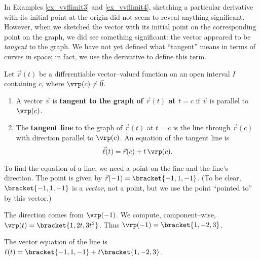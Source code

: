 In Examples \ref{ex_vvflimit3} and \ref{ex_vvflimit4}, sketching a particular derivative with its initial point at the origin did not seem to reveal anything significant. However, when we sketched the vector with its initial point on the corresponding point on the graph, we did see something significant: the vector appeared to be \textit{tangent} to the graph. We have not yet defined what ``tangent'' means in terms of curves in space; in fact, we use the derivative to define this term.

{Let $\vec r(t)$ be a differentiable vector--valued function on an open interval $I$ containing $c$, where $\vrp(c)\neq \vec 0$.
\begin{enumerate}
	\item A vector $\vec v$ is \textbf{tangent to the graph of $\vec r(t)$ at $t=c$} if $\vec v$ is parallel to $\vrp(c)$.
	\item	The \textbf{tangent line}  to the graph of $\vec r(t)$ at $t=c$ is the line through $\vec r(c)$ with direction parallel to $\vrp(c)$. An equation of the tangent line is 
	\[\vec \ell(t) = \vec r(c) + t\,\vrp(c).\]
\end{enumerate}}


{To find the equation of a line, we need a point on the line and the line's direction. The point is given by $\vec r(-1) =\bracket{-1,1,-1}$. (To be clear, $\bracket{-1,1,-1}$ is a \emph{vector}, not a point, but we use the point ``pointed to'' by this vector.)

The direction comes from $\vrp(-1)$. We compute, component--wise, $\vrp(t) =\bracket{1,2t, 3t^2}$. Thus $\vrp(-1) =\bracket{1,-2,3}$. 

The vector equation of the line is $\ell(t) =\bracket{-1,1,-1}+ t\bracket{1,-2,3}$. }

